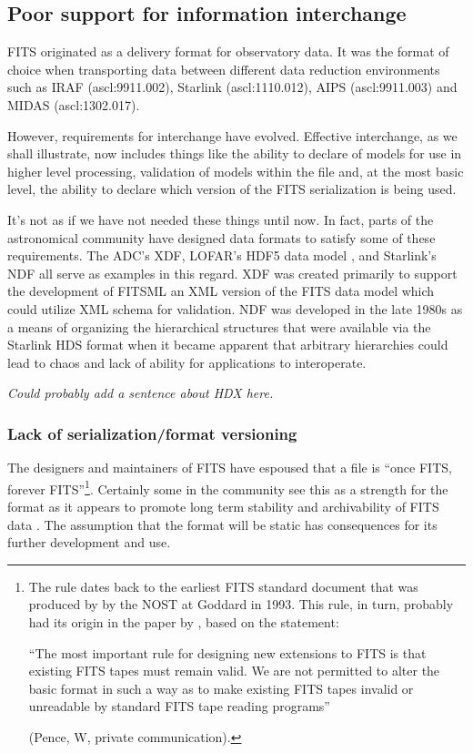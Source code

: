 \documentclass[final,authoryear,5p,times,twocolumn]{elsarticle}
\begin{document}
\subsection{Poor support for information interchange}

FITS originated as a delivery format for observatory data. It was the
format of choice when transporting data between different data
reduction environments such as IRAF (ascl:9911.002), Starlink
(ascl:1110.012), AIPS (ascl:9911.003) and MIDAS (ascl:1302.017).


However, requirements for interchange have evolved. Effective
interchange, as we shall illustrate, now includes things like the
ability to declare of models for use in higher level processing,
validation of models within the file and, at the most basic level, the
ability to declare which version of the FITS serialization is being
used.


It's not as if we have not needed these things until now. In fact,
parts of the astronomical community have designed data formats to
satisfy some of these requirements. The ADC's XDF, LOFAR's HDF5 data
model \citep{2012ASPC..461..283A}, and Starlink's NDF
\citep{1988STARB...2...11C,1993ASPC...52..229W,P91_adassxxiii} all
serve as examples in this regard. XDF was created primarily to support
the development of FITSML an XML version of the FITS data model which
could utilize XML schema for validation. NDF was developed in the late
1980s as a means of organizing the hierarchical structures that were
available via the Starlink HDS format when it became apparent that
arbitrary hierarchies could lead to chaos and lack of ability for
applications to interoperate.

\textit{Could probably add a sentence about HDX here.}

\subsubsection{Lack of serialization/format versioning}


The designers and maintainers of FITS have espoused that a file is
``once FITS, forever FITS''\footnote{The rule dates back to the earliest
FITS standard document that was produced by by the NOST at Goddard in
1993. This rule, in turn, probably had its origin in the paper by
\citet{1988A&AS...73..359G}, based on the statement:

``The most important rule for designing new extensions to FITS is that
existing FITS tapes must remain valid.  We are not permitted to alter
the basic format in such a way as to make existing FITS tapes invalid
or unreadable by standard FITS tape reading programs''

(Pence, W, private communication).}.
Certainly some in the community see
this as a strength for the format as it appears to promote long term
stability and archivability of FITS data \citep[][US Library
of Congress\footnote{see \url{http://www.digitalpreservation.gov/formats/fdd/fdd000317.shtml}}]{2012EWASSAlle}.
The assumption that the format will be static has
consequences for its further development and use.
\end{document}
